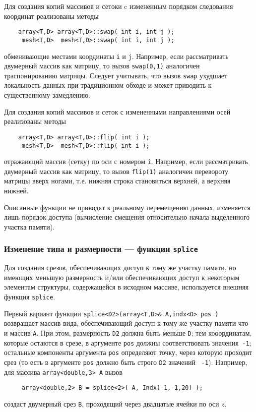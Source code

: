 Для создания копий массивов и сетоки c измененным порядком следования координат реализованы методы
\begin{verbatim}
    array<T,D> array<T,D>::swap( int i, int j );
     mesh<T,D>  mesh<T,D>::swap( int i, int j );
\end{verbatim}
обменивающие местами координаты {\tt i} и {\tt j}. Например, если рассматривать двумерный
массив как матрицу, то вызов {\tt swap(0,1)} аналогичен траспонированию матрицы.
Следует учитывать, что вызов {\tt swap} ухудшает локальность данных при
традиционном обходе и может приводить к существенному замедлению.

Для создания копий массивов и сеток с измененными направлениями осей реализованы методы 
\begin{verbatim}
    array<T,D> array<T,D>::flip( int i );
     mesh<T,D>  mesh<T,D>::flip( int i );
\end{verbatim}
отражающий массив (сетку) по оси с номером {\tt i}. Например, если рассматривать двумерный
массив как матрицу, то вызов {\tt flip(1)} аналогичен перевороту матрицы вверх
ногами, т.е. нижняя строка становиться верхней, а верхняя нижней.

Описанные функции не приводят к реальному перемещению данных, изменяется лишь
порядок доступа (вычисление смещения относительно начала выделенного участка памяти).

\subsubsection{Изменение типа и размерности --- функции {\tt splice}}
Для создания срезов, обеспечивающих доступ к тому же
участку памяти, но имеющих меньшую размерность и/или обеспечивающих доступ к
некоторым элементам структуры, содержащейся в исходном массиве, используется
внешняя функция {\tt splice}. 

Первый вариант функции {\tt splice<D2>(array<T,D>\&
  A,indx<D> pos )} возвращает массив вида,
обеспечивающий доступ к тому же участку памяти что и массив {\tt A}. При
этом, размерность {\tt D2} должна быть меньше {\tt D}; тем кооординатам, которые остаются в срезе, в аргументе
{\tt pos} должны соответствовать значения~{\tt-1}; остальные компоненты
аргумента {\tt pos} определяют точку, через которую проходит срез (то есть
в аргументе {\tt pos} должно быть строго {\tt D2} значений {\tt
  -1}). Например, для массива {\tt array<double,3> A} вызов 
\begin{verbatim}
     array<double,2> B = splice<2>( A, Indx(-1,-1,20) );
\end{verbatim}
создаст двумерный срез {\tt B}, проходящий через двадцатые ячейки по оси $z$.

